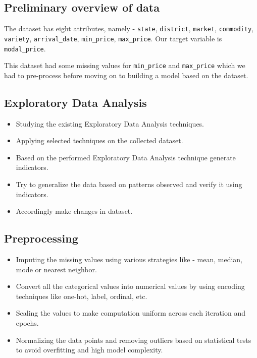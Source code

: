     \subsection{Preliminary overview of data}
        The dataset has eight attributes, namely - \texttt{state}, \texttt{district}, \texttt{market}, \texttt{commodity}, \texttt{variety}, \texttt{arrival\_date}, \texttt{min\_price}, \texttt{max\_price}. Our target variable is \texttt{modal\_price}.

        This dataset had some missing values for \texttt{min\_price} and \texttt{max\_price} which we had to pre-process before moving on to building a model based on the dataset.
        
    \subsection{Exploratory Data Analysis}
        \begin{itemize}
            \item 
                Studying the existing Exploratory Data Analysis techniques.
            \item 
                Applying selected techniques on the collected dataset.
            \item
                Based on the performed Exploratory Data Analysis technique generate indicators.
            \item 
                Try to generalize the data based on patterns observed and verify it using indicators.
            \item
                Accordingly make changes in dataset.
        \end{itemize}
    
    \subsection{Preprocessing}
        \begin{itemize}
            \item 
                Imputing the missing values using various strategies like - mean, median, mode or nearest neighbor.
            \item 
                Convert all the categorical values into numerical values by using encoding techniques like one-hot, label, ordinal, etc.
            \item
                Scaling the values to make computation uniform across each iteration and epochs.
            \item
                Normalizing the data points and removing outliers based on statistical tests to avoid overfitting and high model complexity.
        \end{itemize}
    
